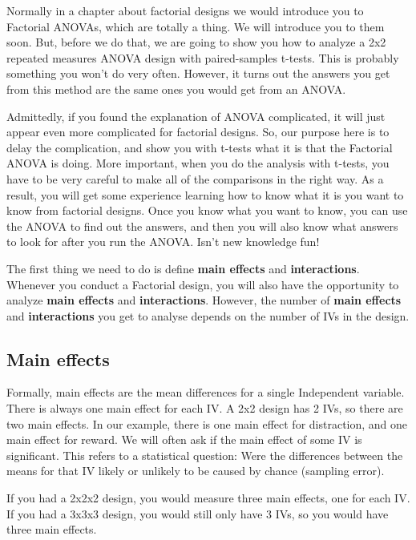\documentclass[]{book}
\begin{document}
Normally in a chapter about factorial designs we would introduce you to Factorial ANOVAs, which are totally a thing. We will introduce you to them soon. But, before we do that, we are going to show you how to analyze a 2x2 repeated measures ANOVA design with paired-samples t-tests. This is probably something you won't do very often. However, it turns out the answers you get from this method are the same ones you would get from an ANOVA.

Admittedly, if you found the explanation of ANOVA complicated, it will just appear even more complicated for factorial designs. So, our purpose here is to delay the complication, and show you with t-tests what it is that the Factorial ANOVA is doing. More important, when you do the analysis with t-tests, you have to be very careful to make all of the comparisons in the right way. As a result, you will get some experience learning how to know what it is you want to know from factorial designs. Once you know what you want to know, you can use the ANOVA to find out the answers, and then you will also know what answers to look for after you run the ANOVA. Isn't new knowledge fun!

The first thing we need to do is define \textbf{main effects} and \textbf{interactions}. Whenever you conduct a Factorial design, you will also have the opportunity to analyze \textbf{main effects} and \textbf{interactions}. However, the number of \textbf{main effects} and \textbf{interactions} you get to analyse depends on the number of IVs in the design.

\hypertarget{main-effects}{%
\subsection{Main effects}\label{main-effects}}

Formally, main effects are the mean differences for a single Independent variable. There is always one main effect for each IV. A 2x2 design has 2 IVs, so there are two main effects. In our example, there is one main effect for distraction, and one main effect for reward. We will often ask if the main effect of some IV is significant. This refers to a statistical question: Were the differences between the means for that IV likely or unlikely to be caused by chance (sampling error).

If you had a 2x2x2 design, you would measure three main effects, one for each IV. If you had a 3x3x3 design, you would still only have 3 IVs, so you would have three main effects.
\end{document}
